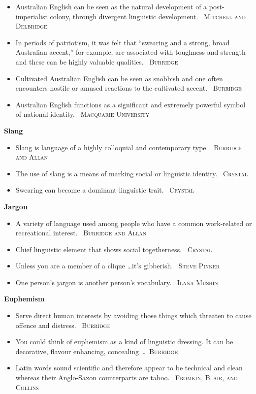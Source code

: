 \documentclass[a4paper]{article}
\newcommand{\heading}[1]{\textbf{#1}}
\newcommand{\linguist}[1]{\textemdash~\textsc{#1}}
\begin{document}
\begin{multicols}{2}
\begin{itemize}
    \item Australian English can be seen as the natural development of a post-imperialist colony, through divergent linguistic development. \linguist{Mitchell and Delbridge}
    \item In periods of patriotism, it was felt that ``swearing and a strong, broad Australian accent,'' for example, are associated with toughness and strength and these can be highly valuable qualities. \linguist{Burridge}
    \item Cultivated Australian English can be seen as snobbish and one often encounters hostile or amused reactions to the cultivated accent. \linguist{Burridge}
    \item Australian English functions as a significant and extremely powerful symbol of national identity. \linguist{Macquarie University}
  \end{itemize}
  \heading{Slang}
  \begin{itemize}
    \item Slang is language of a highly colloquial and contemporary type. \linguist{Burridge and Allan}
    \item The use of slang is a means of marking social or linguistic identity. \linguist{Crystal}
    \item Swearing can become a dominant linguistic trait. \linguist{Crystal}
  \end{itemize}
  \heading{Jargon}
  \begin{itemize}
    \item A variety of language used among people who have a common work-related or recreational interest. \linguist{Burridge and Allan}
    \item Chief linguistic element that shows social togetherness. \linguist{Crystal}
    \item Unless you are a member of a clique \dots it's gibberish. \linguist{Steve Pinker}
    \item One person's jargon is another person's vocabulary. \linguist{Ilana Mushin}
  \end{itemize}
  \heading{Euphemism}
  \begin{itemize}
    \item Serve direct human interests by avoiding those things which threaten to  cause offence and distress. \linguist{Burridge}
    \item You could think of euphemism as a kind of linguistic dressing. It can be decorative, flavour enhancing, concealing \dots \linguist{Burridge}
    \item Latin words sound scientific and therefore appear to be technical and clean whereas their Anglo-Saxon counterparts are taboo. \linguist{Fromkin, Blair, and Collins}

\end{itemize}
\end{multicols}
\end{document}
